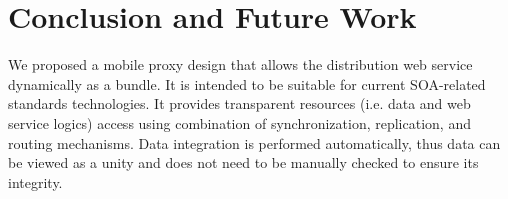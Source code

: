 \documentclass[conference]{IEEEtran}
\begin{document}
%






\section{Conclusion and Future Work}
We proposed a mobile proxy design that allows the distribution web service dynamically as a bundle. It is intended to be suitable for current SOA-related standards technologies. It provides transparent resources (i.e. data and web service logics) access using combination of synchronization, replication, and routing mechanisms. Data integration is performed automatically, thus data can be viewed as a unity and does not need to be manually checked to ensure its integrity.
\end{document}
